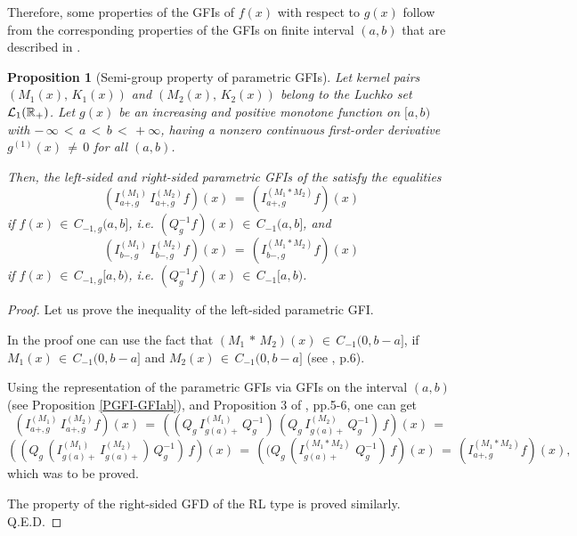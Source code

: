 \documentclass[12pt]{article}
\newtheorem{Proposition}{Proposition}
\begin{document}
Therefore, some properties of 
the GFIs of $f(x)$ with respect to $g(x)$
follow from the corresponding properties of 
the GFIs on finite interval $(a,b)$ that are described in \cite{Luchko2023}. 

\begin{Proposition}[Semi-group property of parametric GFIs]

Let kernel pairs $(M_1(x), \, K_1(x))$ and $(M_2(x), \, K_2(x))$ belong to the Luchko set ${\cal L}_{1}(\mathbb{R}_{+})$.
Let $g(x)$ be an increasing and positive monotone function on $[a, b)$ 
with $ - \, \infty \, < \, a \, < \, b \, < \, +\infty$, 
having a nonzero continuous first-order derivative $g^{(1)}(x) \, \ne \, 0$ for all $(a,b)$.

Then, the left-sided and right-sided parametric GFIs of the satisfy the equalities
\begin{equation}
(I^{(M_1)}_{a+,g} \, I^{(M_2)}_{a+,g} f)(x) \, = \, (I^{(M_1*M_2)}_{a+,g} f)(x)
\end{equation}
if $f(x) \, \in \, C_{-1,g}(a,b]$, 
i.e. $(Q^{-1}_g f)(x) \, \in \, C_{-1}(a,b]$, and
\begin{equation}
(I^{(M_1)}_{b-,g} \, I^{(M_2)}_{b-,g} f)(x) \, = \, (I^{(M_1*M_2)}_{b-,g} f)(x)
\end{equation}
if $f(x) \, \in \, C_{-1,g}[a,b)$, 
i.e. $(Q^{-1}_g f)(x) \, \in \, C_{-1}[a,b)$. 
\end{Proposition}


\begin{proof}
Let us prove the inequality of the left-sided parametric GFI.

In the proof one can use the fact that
$(M_1 \, * \, M_2)(x) \, \in \, C_{-1}(0,b-a]$,
if $M_1(x) \, \in \, C_{-1}(0,b-a]$ and
$M_2(x) \, \in \, C_{-1}(0,b-a]$
(see \cite{Luchko2023}, p.6).

Using the representation of the parametric GFIs via GFIs on the interval $(a,b)$ 
(see Proposition \ref{PGFI-GFIab}), 
and Proposition 3 of \cite{Luchko2023}, pp.5-6, one can get
\[
(I^{(M_1)}_{a+,g} \, I^{(M_2)}_{a+,g} f)(x) \, = \, 
\left( (Q_g \, I^{(M_1)}_{g(a)+} \, Q^{-1}_g) \, 
(Q_g \, I^{(M_2)}_{g(a)+} \, Q^{-1}_g) \, f \right)(x) \, = \, 
\]
\[
\left( (Q_g \, (I^{(M_1)}_{g(a)+} \, 
I^{(M_2)}_{g(a)+}) \, Q^{-1}_g) \, f \right)(x) \, = \, 
\left( (Q_g \, (I^{(M_1 * M_2)}_{g(a)+} \, 
\, Q^{-1}_g) \, f \right)(x) \, = \, 
 (I^{(M_1*M_2)}_{a+,g} f)(x) ,
\]
which was to be proved. 

The property of the right-sided GFD of the RL type is proved similarly.
Q.E.D.
\end{proof}
\end{document}
